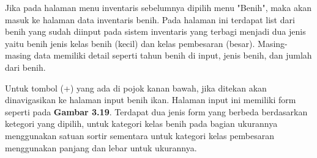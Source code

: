 \begin{enumerate}
\begin{enumerate}
		Jika pada halaman menu inventaris sebelumnya dipilih menu "Benih", maka akan masuk ke halaman data inventaris benih. Pada halaman ini terdapat list dari benih yang sudah diinput pada sistem inventaris yang terbagi menjadi dua jenis yaitu benih jenis kelas benih (kecil) dan kelas pembesaran (besar). Masing-masing data memiliki detail seperti tahun benih di input, jenis benih, dan jumlah dari benih.

		Untuk tombol (+) yang ada di pojok kanan bawah, jika ditekan akan dinavigasikan ke halaman input benih ikan. Halaman input ini memiliki form seperti pada \textbf{Gambar 3.19}. Terdapat dua jenis form yang berbeda berdasarkan ketegori yang dipilih, untuk kategori kelas benih pada bagian ukurannya menggunakan satuan sortir sementara untuk kategori kelas pembesaran menggunakan panjang dan lebar untuk ukurannya.


\end{enumerate}
\end{enumerate}
